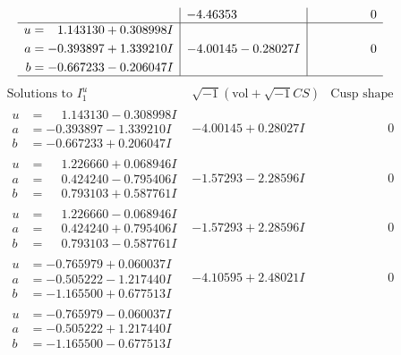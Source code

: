 \documentclass[1p]{elsarticle_modified}
\theoremstyle{definition}
\newcommand{\I}{\sqrt{-1}}
\begin{document}
$$\begin{array}{c|c|c}
 & -4.46353\phantom{ +0.000000I} & \phantom{-0.000000 } 0 \\ \hline\begin{aligned}
u &= \phantom{-}1.143130 + 0.308998 I \\
a &= -0.393897 + 1.339210 I \\
b &= -0.667233 - 0.206047 I\end{aligned}
 & -4.00145 - 0.28027 I & \phantom{-0.000000 } 0\\
 \hline 
 \end{array}$$\newpage$$\begin{array}{c|c|c}  
\text{Solutions to }I^u_{1}& \I (\text{vol} + \sqrt{-1}CS) & \text{Cusp shape}\\
 \hline 
\begin{aligned}
u &= \phantom{-}1.143130 - 0.308998 I \\
a &= -0.393897 - 1.339210 I \\
b &= -0.667233 + 0.206047 I\end{aligned}
 & -4.00145 + 0.28027 I & \phantom{-0.000000 } 0 \\ \hline\begin{aligned}
u &= \phantom{-}1.226660 + 0.068946 I \\
a &= \phantom{-}0.424240 - 0.795406 I \\
b &= \phantom{-}0.793103 + 0.587761 I\end{aligned}
 & -1.57293 - 2.28596 I & \phantom{-0.000000 } 0 \\ \hline\begin{aligned}
u &= \phantom{-}1.226660 - 0.068946 I \\
a &= \phantom{-}0.424240 + 0.795406 I \\
b &= \phantom{-}0.793103 - 0.587761 I\end{aligned}
 & -1.57293 + 2.28596 I & \phantom{-0.000000 } 0 \\ \hline\begin{aligned}
u &= -0.765979 + 0.060037 I \\
a &= -0.505222 - 1.217440 I \\
b &= -1.165500 + 0.677513 I\end{aligned}
 & -4.10595 + 2.48021 I & \phantom{-0.000000 } 0 \\ \hline\begin{aligned}
u &= -0.765979 - 0.060037 I \\
a &= -0.505222 + 1.217440 I \\
b &= -1.165500 - 0.677513 I\end{aligned}

\end{array}$$
\end{document}
